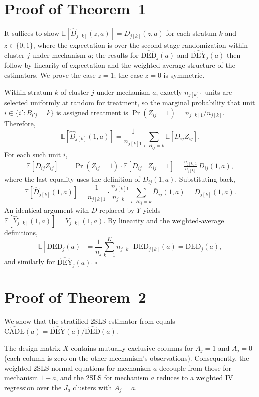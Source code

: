 \appendix

\section{Proof of Theorem~1}
\label{app:proof-unbiased}

It suffices to show $\mathbb{E}[\widehat{D}_{j[k]}(z,a)] = D_{j[k]}(z,a)$ for each stratum $k$ and $z\in\{0,1\}$, where the expectation is over the second-stage randomization within cluster $j$ under mechanism $a$; the results for $\widehat{\mathrm{DED}}_j(a)$ and $\widehat{\mathrm{DEY}}_j(a)$ then follow by linearity of expectation and the weighted-average structure of the estimators. We prove the case $z=1$; the case $z=0$ is symmetric.

Within stratum $k$ of cluster $j$ under mechanism $a$, exactly $n_{j[k]1}$ units are selected uniformly at random for treatment, so the marginal probability that unit $i\in\{i': B_{i'j}=k\}$ is assigned treatment is $\Pr(Z_{ij}=1)=n_{j[k]1}/n_{j[k]}$. Therefore,
$$
\mathbb{E}\!\left[\widehat{D}_{j[k]}(1,a)\right]
= \frac{1}{n_{j[k]1}}\sum_{i:\,B_{ij}=k}\mathbb{E}[D_{ij}Z_{ij}].
$$
For each such unit $i$,
\begin{align*}
\mathbb{E}[D_{ij}Z_{ij}]
&= \Pr(Z_{ij}=1)\cdot\mathbb{E}[D_{ij}\mid Z_{ij}=1]
= \frac{n_{j[k]1}}{n_{j[k]}}\,\bar{D}_{ij}(1,a),
\end{align*}
where the last equality uses the definition of $\bar{D}_{ij}(1,a)$. Substituting back,
$$
\mathbb{E}\!\left[\widehat{D}_{j[k]}(1,a)\right]
= \frac{1}{n_{j[k]1}}\cdot\frac{n_{j[k]1}}{n_{j[k]}}\sum_{i:\,B_{ij}=k}\bar{D}_{ij}(1,a)
= D_{j[k]}(1,a).
$$
An identical argument with $D$ replaced by $Y$ yields $\mathbb{E}[\widehat{Y}_{j[k]}(1,a)]=Y_{j[k]}(1,a)$. By linearity and the weighted-average definitions,
$$
\mathbb{E}[\widehat{\mathrm{DED}}_j(a)]
= \frac{1}{n_j}\sum_{k=1}^K n_{j[k]}\,\mathrm{DED}_{j[k]}(a)
= \mathrm{DED}_j(a),
$$
and similarly for $\widehat{\mathrm{DEY}}_j(a)$. \hfill$\square$

\section{Proof of Theorem~2}
\label{app:proof-2sls}

We show that the stratified 2SLS estimator from equals
$\widehat{\mathrm{CADE}}(a) = \widehat{\mathrm{DEY}}(a)/\widehat{\mathrm{DED}}(a)$.

The design matrix $X$ contains mutually exclusive columns for $A_j=1$ and $A_j=0$ (each
column is zero on the other mechanism's observations). Consequently, the weighted
2SLS normal equations for mechanism $a$ decouple from those for mechanism $1-a$, and
the 2SLS for mechanism $a$ reduces to a weighted IV regression over the $J_a$ clusters
with $A_j = a$.


